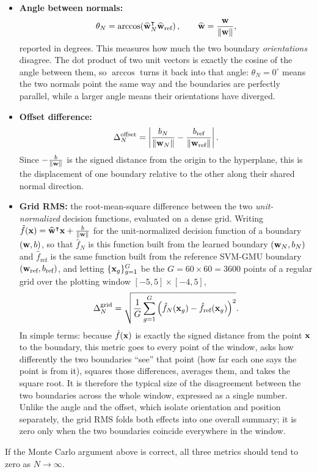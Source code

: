 \documentclass[11pt, letterpaper]{article}
\begin{document}
\begin{itemize}[leftmargin=2em]
    \item \textbf{Angle between normals:}
    \begin{equation}
        \theta_N = \arccos\!\left(\widehat{\vb{w}}_N^{\intercal}\widehat{\vb{w}}_{\text{ref}}\right),
        \qquad \widehat{\vb{w}} = \frac{\vb{w}}{\|\vb{w}\|},
    \end{equation}
    reported in degrees. This measures how much the two boundary \emph{orientations} disagree. The dot product of two unit vectors is exactly the cosine of the angle between them, so $\arccos$ turns it back into that angle: $\theta_N = 0^{\circ}$ means the two normals point the same way and the boundaries are perfectly parallel, while a larger angle means their orientations have diverged.
    \item \textbf{Offset difference:}
    \begin{equation}
        \Delta_N^{\text{offset}} = \left|\frac{b_N}{\|\vb{w}_N\|} - \frac{b_{\text{ref}}}{\|\vb{w}_{\text{ref}}\|}\right|.
    \end{equation}
    Since $-\frac{b}{\|\vb{w}\|}$ is the signed distance from the origin to the hyperplane, this is the displacement of one boundary relative to the other along their shared normal direction.
    \item \textbf{Grid RMS:} the root-mean-square difference between the two \emph{unit-normalized} decision functions, evaluated on a dense grid. Writing $\hat{f}(\vb{x}) = \widehat{\vb{w}}^{\intercal}\vb{x} + \frac{b}{\|\vb{w}\|}$ for the unit-normalized decision function of a boundary $(\vb{w}, b)$, so that $\hat{f}_N$ is this function built from the learned boundary $(\vb{w}_N, b_N)$ and $\hat{f}_{\text{ref}}$ is the same function built from the reference SVM-GMU boundary $(\vb{w}_{\text{ref}}, b_{\text{ref}})$, and letting $\{\vb{x}_g\}_{g=1}^{G}$ be the $G = 60 \times 60 = 3600$ points of a regular grid over the plotting window $[-5, 5] \times [-4, 5]$,
    \begin{equation}
        \Delta_N^{\text{grid}} = \sqrt{\frac{1}{G}\sum_{g=1}^{G}\left(\hat{f}_N(\vb{x}_g) - \hat{f}_{\text{ref}}(\vb{x}_g)\right)^2}.
    \end{equation}
    In simple terms: because $\hat{f}(\vb{x})$ is exactly the signed distance from the point $\vb{x}$ to the boundary, this metric goes to every point of the window, asks how differently the two boundaries ``see'' that point (how far each one says the point is from it), squares those differences, averages them, and takes the square root. It is therefore the typical size of the disagreement between the two boundaries across the whole window, expressed as a single number. Unlike the angle and the offset, which isolate orientation and position separately, the grid RMS folds both effects into one overall summary; it is zero only when the two boundaries coincide everywhere in the window.
\end{itemize}
If the Monte Carlo argument above is correct, all three metrics should tend to zero as $N \to \infty$.
\end{document}
